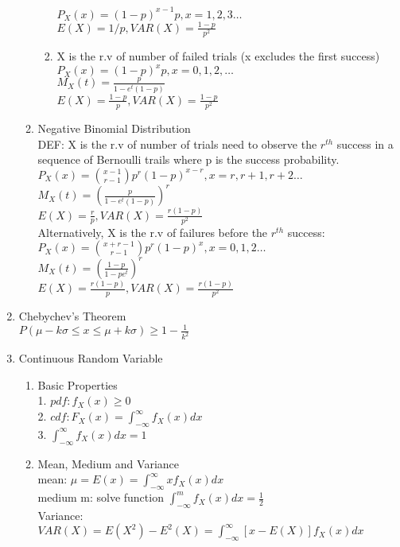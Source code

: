 \documentclass[10pt]{article}
\begin{document}
\begin{multicols}{2}
\begin{enumerate}
\begin{enumerate}
\begin{enumerate}
					$P_X(x) = (1-p)^{x-1}p, x = 1,2,3 \dots$\\
					$E(X) = 1/p, VAR(X) = \frac{1-p}{p^2}$
					\item X is the r.v of number of failed trials (x excludes the first success)\\
					$P_X(x) = (1-p)^xp, x = 0,1,2,\dots$\\
					$M_X(t) = \frac{p}{1-e^t(1-p)}$\\
					$E(X) = \frac{1-p}{p}, VAR(X) = \frac{1-p}{p^2}$
				\end{enumerate}
				\item Negative Binomial Distribution\\
					DEF: X is the r.v of number of trials need to observe the $r^{th}$ success in a sequence of Bernoulli trails where p is the success probability.\\
					$P_X(x) = {x-1 \choose r-1}p^r(1-p)^{x-r}, x = r,r+1,r+2 \dots$\\
					$M_X(t) = (\frac{p}{1-e^t(1-p)})^r$\\
					$E(X) = \frac{r}{p}, VAR(X) = \frac{r(1-p)}{p^2}$\\
					Alternatively, X is the r.v of failures before the $r^{th}$ success:\\
					$P_X(x) = {x+r-1 \choose r-1}p^r(1-p)^x, x = 0,1,2 \dots$\\
					$M_X(t) = (\frac{1-p}{1-pe^t})^r$\\
					$E(X) = \frac{r(1-p)}{p}, VAR(X) = \frac{r(1-p)}{p^2}$\\
			\end{enumerate}
			\item Chebychev's Theorem\\
			$P(\mu-k\sigma \le x \le \mu+k\sigma) \ge 1-\frac{1}{k^2}$
			\item Continuous Random Variable
			\begin{enumerate}
				\item Basic Properties\\
				1. $pdf: f_X(x) \ge 0$\\
				2. $cdf: F_X(x) = \int_{-\infty}^{\infty} f_X(x)dx$\\
				3. $\int_{-\infty}^{\infty}f_X(x)dx = 1$
				\item Mean, Medium and Variance\\
				mean: $\mu = E(x) = \int_{-\infty}^{\infty}xf_X(x)dx$\\
				medium m: solve function $\int_{-\infty}^{m} f_X(x)dx = \frac{1}{2}$\\
				Variance: \\
				$VAR(X) = E(X^2) - E^2(X) = \int_{-\infty}^{\infty}[x-E(X)]f_X(x)dx$
			\end{enumerate}
		\end{enumerate}
	\newpage
	\end{multicols}
\end{document}
